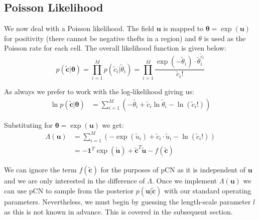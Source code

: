 \documentclass[]{article}
\newcommand{\loglik}{\Lambda}
\newcommand{\cbold}{\boldsymbol{c}}
\newcommand{\ubold}{\boldsymbol{u}}
\newcommand{\thetabold}{\boldsymbol{\theta}}
\begin{document}
\subsection{Poisson Likelihood}

We now deal with a Poisson likelihood. The field $\ubold$ is mapped to $\thetabold = \exp (\ubold)$ for positivity (there cannot be negative thefts in a region) and $\theta$ is used as the Poisson rate for each cell. The overall likelihood function is given below:
%
\begin{equation}
	p(\tilde{\cbold} | \thetabold) = \prod_{i=1}^{M} p(\tilde{c}_i | \tilde{\theta}_i)
	= \prod_{i=1}^{M} \frac{\exp (-\tilde{\theta}_i) \cdot \tilde{\theta}_i^{\tilde{c}_i}}{\tilde{c}_i!}
\end{equation}

As always we prefer to work with the log-likelihood giving us:
%
\begin{align}
	\ln p (\tilde{\cbold} | \thetabold) &= \sum_{i=1}^{M} \left( - \tilde{\theta_i} + \tilde{c}_i \ln \tilde{\theta}_i - \ln (\tilde{c}_i !) \right)
\end{align}

Substituting for $\thetabold = \exp (\ubold)$ we get:
%
\begin{align}
	\loglik(\ubold) &= \sum_{i=1}^{M} \left(- 
		\exp(\tilde{u}_i) + \tilde{c}_i \cdot \tilde{u}_i - \ln(\tilde{c}_i !)
	\right) \nonumber \\
	&= - \mathbf{1}^T \exp(\tilde{\ubold}) + \tilde{\cbold}^T \tilde{\ubold} - f(\tilde{\cbold})
	\label{eqn:log-lik-poisson}
\end{align}

We can ignore the term $f(\tilde{\cbold})$ for the purposes of pCN as it is independent of $\ubold$ and we are only interested in the difference of $\loglik$. Once we implement $\loglik(\ubold)$ we can use pCN to sample from the posterior $p(\ubold | \tilde{\cbold})$ with our standard operating parameters. Nevertheless, we must begin by guessing the length-scale parameter $l$ as this is not known in advance. This is covered in the subsequent section.
\end{document}
